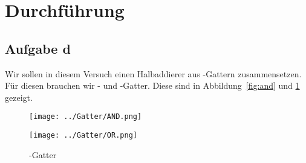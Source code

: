 
\section{Durchführung}

\subsection{Aufgabe d}

Wir sollen in diesem Versuch einen Halbaddierer aus \tnand-Gattern
zusammensetzen. Für diesen brauchen wir \tand- und \tor-Gatter. Diese sind in
Abbildung~\ref{fig:and} und \ref{fig:or} gezeigt.

\begin{figure}[htbp]
	\centering
	\begin{minipage}{.45\linewidth}
		\texttt{[image: ../Gatter/AND.png]}
		\caption{%
			\tand-Gatter.
			\cite[Seite~20]{wirsum/experimente_schaltglieder}
		}
		\label{fig:and}
	\end{minipage}
	\hfill
	\begin{minipage}{.45\linewidth}
		\texttt{[image: ../Gatter/OR.png]}
		\caption{%
			\tor-Gatter
			\cite[Seite~21]{wirsum/experimente_schaltglieder}
		}
		\label{fig:or}
	\end{minipage}
\end{figure}


\FloatBarrier
\IfFileExists{\bibliographyfile}{
	
}{}




